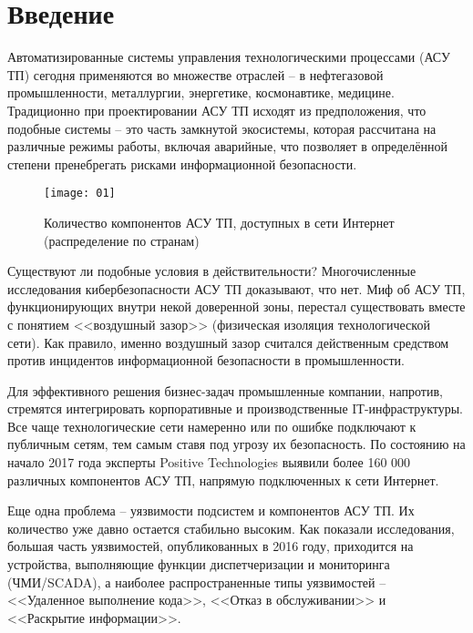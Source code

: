 \section{Введение}
Автоматизированные системы управления технологическими процессами (АСУ ТП) сегодня применяются во множестве отраслей -- в нефтегазовой промышленности, металлургии, энергетике, космонавтике, медицине. Традиционно при проектировании АСУ ТП исходят из предположения, что подобные системы -- это часть замкнутой экосистемы, которая рассчитана на различные режимы работы, включая аварийные, что позволяет в определённой степени пренебрегать рисками информационной безопасности.\par

\begin{figure}[h!]
    \centering
    \texttt{[image: 01]}
    \caption{Количество компонентов АСУ ТП, доступных в сети Интернет (распределение по странам)}
    \label{img:01}
\end{figure}

Существуют ли подобные условия в действительности? Многочисленные исследования кибербезопасности АСУ ТП доказывают, что нет. Миф об АСУ ТП, функционирующих внутри некой доверенной зоны, перестал существовать вместе с понятием <<воздушный зазор>> (физическая изоляция технологической сети). Как правило, именно воздушный зазор считался действенным средством против инцидентов информационной безопасности в промышленности.\par

Для эффективного решения бизнес-задач промышленные компании, напротив, стремятся интегрировать корпоративные и производственные IТ-инфраструктуры. Все чаще технологические сети намеренно или по ошибке подключают к публичным сетям, тем самым ставя под угрозу их безопасность. По состоянию на начало 2017 года эксперты Positive Technologies выявили более 160 000 различных компонентов АСУ ТП, напрямую подключенных к сети Интернет.\par

Еще одна проблема -- уязвимости подсистем и компонентов АСУ ТП. Их количество уже давно остается стабильно высоким. Как показали исследования, большая часть уязвимостей, опубликованных в 2016 году, приходится на устройства, выполняющие функции диспетчеризации и мониторинга (ЧМИ/SCADA), а наиболее распространенные типы уязвимостей -- <<Удаленное выполнение кода>>, <<Отказ в обслуживании>> и <<Раскрытие информации>>.\par

